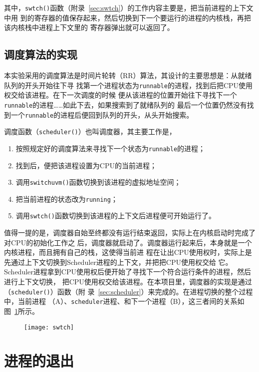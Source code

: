 \documentclass{swfuthesism}
\begin{document}
其中，\texttt{swtch()}函数（附录~\ref{sec:swtch}）的工作内容主要是，把当前进程的上下文中用
到的寄存器的值保存起来，然后切换到下一个要运行的进程的内核栈，再把该内核栈中进程上下文里的
寄存器弹出就可以返回了。

\subsection{调度算法的实现}

本实验采用的调度算法是时间片轮转（RR）算法，其设计的主要思想是：从就绪队列的开头开始往下寻
找第一个进程状态为\texttt{runnable}的进程，找到后把CPU使用权交给该进程。在下一次调度的时候
便从该进程的位置开始往下寻找下一个\texttt{runnable}的进程……如此下去，如果搜索到了就绪队列的
最后一个位置仍然没有找到一个\texttt{runnable}的进程后便回到队列的开头，从头开始搜索。

调度函数（\texttt{scheduler()}）也叫调度器，其主要工作是，
\begin{enumerate}
\item 按照规定好的调度算法来寻找下一个状态为\texttt{runnable}的进程；
\item 找到后，便把该进程设置为CPU的当前进程；
\item 调用\texttt{switchuvm()}函数切换到该进程的虚拟地址空间；
\item 把当前进程的状态改为\texttt{running}；
\item 调用\texttt{swtch()}函数切换到该进程的上下文后进程便可开始运行了。
\end{enumerate}
值得一提的是，调度器自始至终都没有运行结束返回，实际上在内核启动时完成了对CPU的初始化工作之
后，调度器就启动了。调度器运行起来后，本身就是一个内核进程，而且拥有自己的栈，这使得当前进
程在让出CPU使用权时，实际上是先通过上下文切换到Scheduler进程的上下文，并把把CPU使用权交给
它。Scheduler进程拿到CPU使用权后便开始了寻找下一个符合运行条件的进程，然后进行上下文切换，
把CPU使用权交给该进程。在本项目里，调度器的实现是通过（\texttt{scheduler()}）函数（附
录~\ref{sec:scheduler}）来完成的。在进程切换的整个过程中，当前进程
（A）、\texttt{scheduler}进程、和下一个进程（B），这三者间的关系如图~\ref{fig:swtch}所示。

\begin{figure}[ht]
  \centering
  \texttt{[image: swtch]}
  \label{fig:swtch}
\end{figure}

\section{进程的退出}
\end{document}
